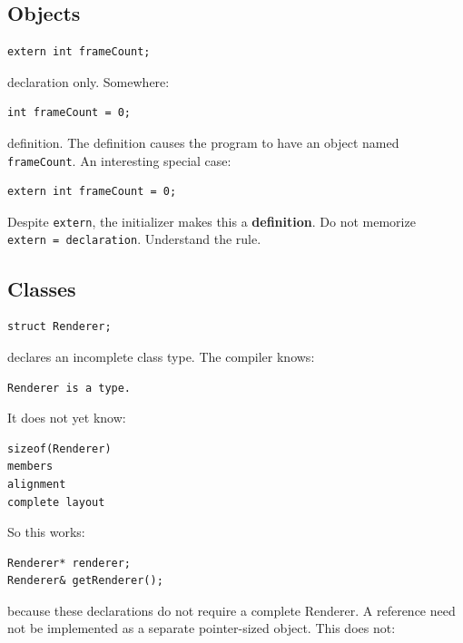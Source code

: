 \subsection{Objects}\label{01-foundations-i-ch002-objects}

\begin{verbatim}
extern int frameCount;
\end{verbatim}

declaration only. Somewhere:

\begin{verbatim}
int frameCount = 0;
\end{verbatim}

definition. The definition causes the program to have an object named \texttt{frameCount}. An interesting special case:

\begin{verbatim}
extern int frameCount = 0;
\end{verbatim}

Despite \texttt{extern}, the initializer makes this a \textbf{definition}. Do not memorize \texttt{extern\ =\ declaration}. Understand the rule.

\subsection{Classes}\label{01-foundations-i-ch002-classes}

\begin{verbatim}
struct Renderer;
\end{verbatim}

declares an incomplete class type. The compiler knows:

\begin{verbatim}
Renderer is a type.
\end{verbatim}

It does not yet know:

\begin{verbatim}
sizeof(Renderer)
members
alignment
complete layout
\end{verbatim}

So this works:

\begin{verbatim}
Renderer* renderer;
Renderer& getRenderer();
\end{verbatim}

because these declarations do not require a complete Renderer. A reference need not be implemented as a separate pointer-sized object. This does not:

